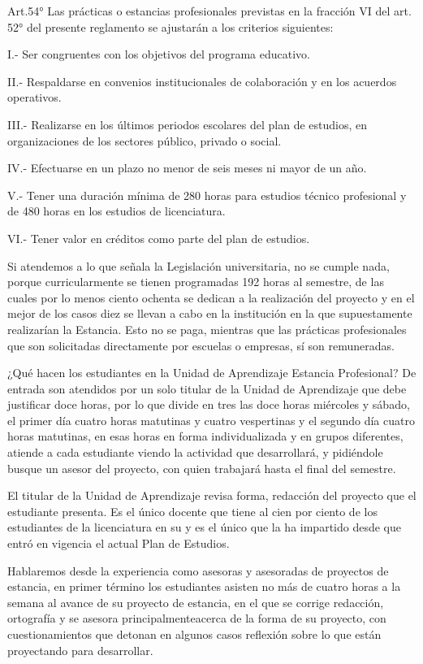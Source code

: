 Art.54° Las prácticas o estancias profesionales previstas en la fracción VI
del art. 52° del presente reglamento se ajustarán a los criterios
siguientes:
\begin{Obs}
\item[I.-] Ser congruentes con los objetivos del programa educativo.
\item[II.-] Respaldarse en convenios institucionales de colaboración y en los
acuerdos operativos.
\item[III.-] Realizarse en los últimos periodos escolares del plan de estudios, en
organizaciones de los sectores público, privado o social.
\item[IV.-] Efectuarse en un plazo no menor de seis meses ni mayor de un año.
\item[V.-] Tener una duración mínima de 280 horas para estudios técnico profesional y
de 480 horas en los estudios de licenciatura.
\item[VI.-] Tener valor en créditos como parte del plan de estudios.
\end{Obs}

Si atendemos a lo que señala la Legislación universitaria, no se cumple
nada, porque curricularmente se tienen programadas 192 horas al semestre,
de las cuales por lo menos ciento ochenta se dedican a la realización del
proyecto y en el mejor de los casos diez se llevan a cabo en la institución
en la que supuestamente realizarían la Estancia. Esto no se paga, mientras
que las prácticas profesionales que son solicitadas directamente por
escuelas o empresas, sí son remuneradas.


¿Qué hacen los estudiantes en la Unidad de Aprendizaje Estancia Profesional?
De entrada son atendidos por un solo titular de la Unidad de Aprendizaje
que debe justificar doce horas, por lo que divide en tres las doce horas
miércoles y sábado, el primer día cuatro horas matutinas y cuatro
vespertinas y el segundo día cuatro horas matutinas, en esas horas en forma
individualizada y en grupos diferentes, atiende a cada estudiante viendo la
actividad que desarrollará, y pidiéndole busque un asesor del proyecto, con
quien trabajará hasta el final del semestre.


El titular de la Unidad de Aprendizaje revisa forma, redacción del proyecto
que el estudiante presenta. Es el único docente que tiene al cien por
ciento de los estudiantes de la licenciatura en su y es el único que la ha
impartido desde que entró en vigencia el actual Plan de Estudios.

\enlargethispage{1\baselineskip}
Hablaremos desde la experiencia como asesoras y asesoradas de proyectos de
estancia, en primer término los estudiantes asisten no más de cuatro horas
a la semana al avance de su proyecto de estancia, en el que se corrige
redacción, ortografía y se asesora principalmente\linebreak acerca de la forma de su
proyecto, con cuestionamientos que detonan en algunos casos reflexión sobre
lo que están proyectando para desarrollar.

